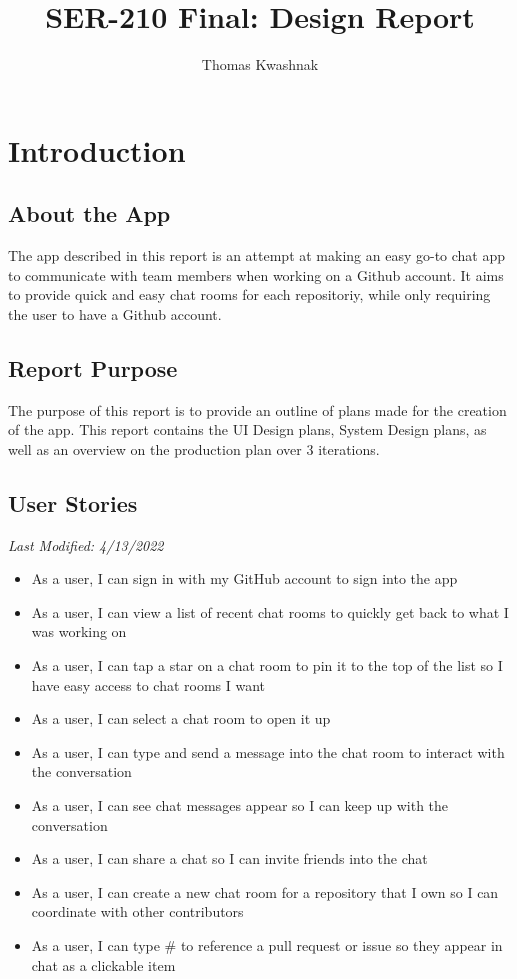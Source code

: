 \documentclass{report}
\title{SER-210 Final: Design Report}
\author{Thomas Kwashnak}
\begin{document}
\maketitle

\tableofcontents
\newpage

\chapter{Introduction}

\section{About the App}
The app described in this report is an attempt at making an easy go-to chat app to communicate with team members when working on a Github account. It aims to provide quick and easy chat rooms for each repositoriy, while only requiring the user to have a Github account.

\section{Report Purpose}
The purpose of this report is to provide an outline of plans made for the creation of the app. This report contains the UI Design plans, System Design plans, as well as an overview on the production plan over 3 iterations.

\section{User Stories}
\textit{Last Modified: 4/13/2022}
\begin{itemize}
    \item As a user, I can sign in with my GitHub account to sign into the app
    \item As a user, I can view a list of recent chat rooms to quickly get back to what I was working on
    \item As a user, I can tap a star on a chat room to pin it to the top of the list so I have easy access to chat rooms I want
    \item As a user, I can select a chat room to open it up
    \item As a user, I can type and send a message into the chat room to interact with the conversation
    \item As a user, I can see chat messages appear so I can keep up with the conversation
    \item As a user, I can share a chat so I can invite friends into the chat
    \item As a user, I can create a new chat room for a repository that I own so I can coordinate with other contributors
    \item As a user, I can type \# to reference a pull request or issue so they appear in chat as a clickable item
\end{itemize}
\end{document}
